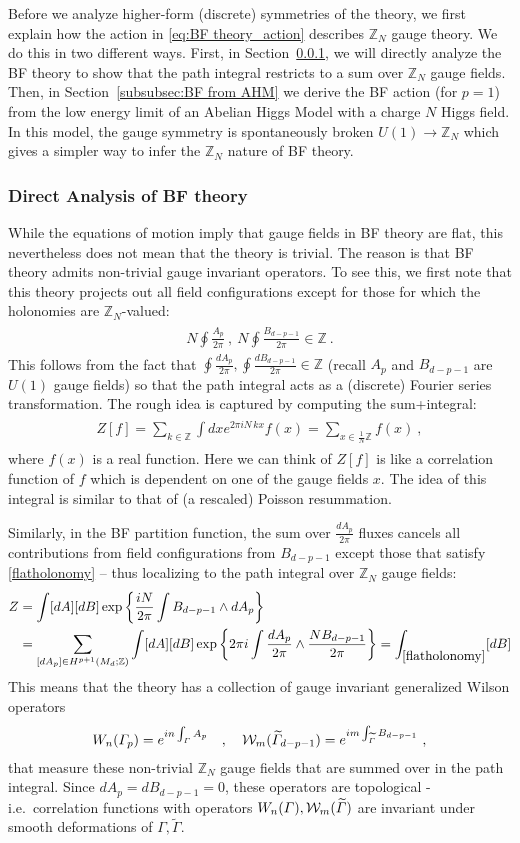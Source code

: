 \documentclass[11pt]{article}
\newcommand{\eq}[1]{\begin{align}\begin{split}#1\end{split}\end{align}}
\newcommand{\twopi}[1]{{\frac{#1}{2\pi}}}
\def\CW {{\cal W}}
\def\IZ{{\mathbb{Z}}}
\begin{document}
Before we analyze higher-form (discrete) symmetries of the theory, we first explain how the action in \eqref{eq:BF theory_action} describes $\IZ_N$ gauge theory. We do this in two different ways. First, in Section~\ref{subsubsec:Wilson_ops_BF}, we will directly analyze the BF theory to show that the path integral restricts to a sum over $\IZ_N$ gauge fields. Then, in Section~\ref{subsubsec:BF from AHM} we derive the BF action (for $p=1$) from the low energy limit of an Abelian Higgs Model with a charge $N$ Higgs field. In this model, the gauge symmetry is spontaneously broken $U(1) \to \IZ_N$ which gives a simpler way to infer the $\IZ_N$ nature of BF theory. 





\subsubsection{Direct Analysis of BF theory}
\label{subsubsec:Wilson_ops_BF}

While the equations of motion imply that gauge fields in BF theory are flat, this nevertheless does not mean that the theory is trivial. The reason is that BF theory admits non-trivial gauge invariant operators. To see this, we first note that this theory projects out all field configurations except for those for which the holonomies are $\IZ_N$-valued:
\eq{\label{flatholonomy}
N\oint \frac{A_p}{2\pi}~,~N\oint \twopi{B_{d-p-1}}\in \IZ~.
}
This follows from the fact that $\oint\frac{dA_p}{2\pi},\oint\frac{dB_{d-p-1}}{2\pi}\in \IZ$ (recall $A_p$ and $B_{d-p-1}$ are $U(1)$ gauge fields) so that the path integral acts as a (discrete) Fourier series transformation. The rough idea is captured by computing the sum+integral:
\eq{
Z[f]=\sum_{k\in \IZ} \int dxe^{ 2\pi i N\, k x}f(x)=\sum_{x\in \frac{1}{N}\IZ}f(x)~,
}
where $f(x)$ is a real function. Here we can think of $Z[f]$ is like a correlation function of $f$ which is dependent on one of the gauge fields $x$. The idea of this integral is similar to that of (a rescaled) Poisson resummation. 



Similarly, in the BF partition function, the sum over $\frac{dA_p}{2\pi}$ fluxes cancels all contributions from field configurations from $B_{d-p-1}$ except those that satisfy \eqref{flatholonomy} -- thus localizing to the path integral over $\IZ_N$ gauge fields:
\eq{
Z&=\int[dA][dB]\,{\rm exp}\left\{\frac{iN}{2\pi}\int B_{d-p-1}\wedge dA_p\right\}\\
&=\sum_{[dA_p]\in H^{p+1}(M_d;\IZ)}\int [dA][dB]\, {\rm exp}\left\{2\pi i \int \frac{dA_p}{2\pi}\wedge \frac{NB_{d-p-1}}{2\pi}\right\}=\int_{\eqref{flatholonomy}} [dB]
}
This means that the theory has a collection of gauge invariant generalized Wilson operators
\eq{
W_n(\Gamma_p)=e^{i n\int_{\Gamma} A_p}\quad, \quad \CW_m(\widetilde\Gamma_{d-p-1})=e^{im \int_{\widetilde\Gamma }B_{d-p-1}}~,
}
that measure these non-trivial $\IZ_N$  gauge fields that are summed over in the path integral. 
Since $dA_p=dB_{d-p-1}=0$, these operators are topological - i.e.~correlation functions with operators $W_n(\Gamma),\CW_m(\widetilde\Gamma)$ are invariant under smooth deformations of $\Gamma,\widetilde\Gamma$. 
\end{document}
